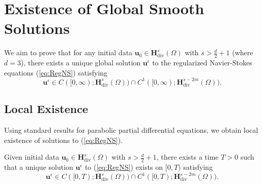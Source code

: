 \documentclass[11pt]{article}
\begin{document}
\section{Existence of Global Smooth Solutions}

We aim to prove that for any initial data $\mathbf{u}_0 \in \mathbf{H}^s_{\text{div}}(\Omega)$ with $s > \frac{d}{2} + 1$ (where $d=3$), there exists a unique global solution $\mathbf{u}^\epsilon$ to the regularized Navier-Stokes equations (\ref{eq:RegNS}) satisfying
\begin{equation}
\mathbf{u}^\epsilon \in C([0, \infty); \mathbf{H}^s_{\text{div}}(\Omega)) \cap C^1([0, \infty); \mathbf{H}^{s - 2m}_{\text{div}}(\Omega)).
\end{equation}

\subsection{Local Existence}

Using standard results for parabolic partial differential equations, we obtain local existence of solutions to (\ref{eq:RegNS}).

\begin{theorem}
Given initial data $\mathbf{u}_0 \in \mathbf{H}^s_{\text{div}}(\Omega)$ with $s > \frac{d}{2} + 1$, there exists a time $T > 0$ such that a unique solution $\mathbf{u}^\epsilon$ to (\ref{eq:RegNS}) exists on $[0, T)$ satisfying
\begin{equation}
\mathbf{u}^\epsilon \in C([0, T); \mathbf{H}^s_{\text{div}}(\Omega)) \cap C^1([0, T); \mathbf{H}^{s - 2m}_{\text{div}}(\Omega)).
\end{equation}
\end{theorem}
\end{document}

